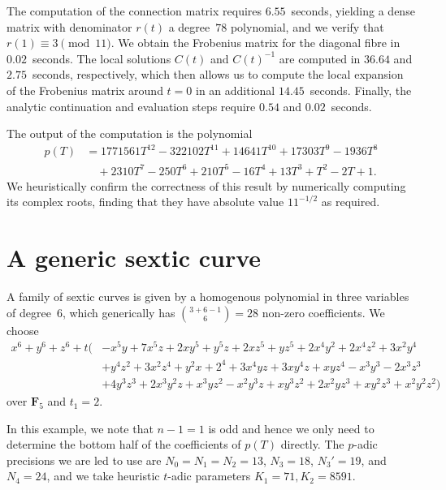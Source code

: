 The computation of the connection matrix requires $6.55$~seconds, 
yielding a dense matrix with denominator $r(t)$ a degree~$78$ 
polynomial, and we verify that $r(1) \equiv 3 \pmod{11}$.  We obtain 
the Frobenius matrix for the diagonal fibre in $0.02$~seconds.  The 
local solutions $C(t)$ and $C(t)^{-1}$ are computed in $36.64$ and 
$2.75$~seconds, respectively, which then allows us to compute the 
local expansion of the Frobenius matrix around $t = 0$ in an additional 
$14.45$~seconds.  Finally, the analytic continuation and evaluation steps 
require $0.54$ and $0.02$~seconds.

The output of the computation is the polynomial 
\begin{align*}
p(T) & = 1771561 T^{12}-322102 T^{11}+14641 T^{10}+17303 T^9-1936 T^8 \\
     & \quad +2310 T^7-250 T^6+210 T^5-16 T^4+13 T^3+T^2-2 T+1.
\end{align*}
We heuristically confirm the correctness of this result by 
numerically computing its complex roots, finding that they 
have absolute value $11^{-1/2}$ as required.

\section{A generic sextic curve}

A family of sextic curves is given by a homogenous polynomial 
in three variables of degree~$6$, which generically has 
$\binom{3+6-1}{6} = 28$ non-zero coefficients.  We choose 
\begin{equation*}
\begin{split}
x^6 + y^6 + z^6 + t \bigl( 
& - x^5 y + 7 x^5 z + 2 x y^5 + y^5 z + 2 x z^5 + y z^5 + 2 x^4 y^2 + 2 x^4 z^2 + 3 x^2 y^4 \\ 
& + y^4 z^2 + 3 x^2 z^4 + y^2 x + 2^4 + 3 x^4 y z + 3 x y^4 z + x y z^4 - x^3 y^3 - 2 x^3 z^3 \\
& + 4 y^3 z^3 + 2 x^3 y^2 z + x^3 y z^2 - x^2 y^3 z + x y^3 z^2 + 2 x^2 y z^3 + x y^2 z^3 
+ x^2 y^2 z^2 \bigr)
\end{split}
\end{equation*}
over $\mathbf{F}_{5}$ and $t_1 = 2$.

In this example, we note that $n-1 = 1$ is odd and hence we only need 
to determine the bottom half of the coefficients of $p(T)$ directly.  
The $p$-adic precisions we are led to use are $N_0 = N_1 = N_2 = 13$, 
$N_3 = 18$, $N_3' = 19$, and $N_4 = 24$, and we take heuristic $t$-adic 
parameters $K_1 = 71, K_2 = 8591$.

